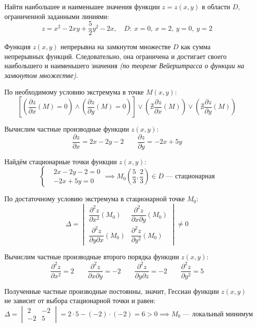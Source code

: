 \begin{problem}
Найти наибольшее и наименьшее значения функции \( z = z(x, y) \) в области \( D \), ограниченной заданными линиями:
\[ z = x^{2} - 2xy + \frac{5}{2}y^2 - 2x, \quad D:\ x=0,\ x=2,\ y=0,\ y=2 \]
\end{problem}

\begin{solution}
  Функция \( z(x,y) \) непрерывна на замкнутом множестве \( D \) как сумма непрерывных функций. Следовательно, она ограничена и достигает своего наибольшего и наименьшего значения \textit{(по теореме Вейерштрасса о функции на замкнутом множестве)}.

  По необходимому условию экстремума в точке \( M(x,y) \):
  \[ \left[\left(\dfrac{\partial z}{\partial x}(M)=0\right)\land\left(\dfrac{\partial z}{\partial y}(M)=0\right)\right]\lor\left(\nexists\dfrac{\partial z}{\partial x}(M)\right)\lor\left(\nexists\dfrac{\partial z}{\partial y}(M)\right) \]
  
  Вычислим частные производные функции \( z(x,y) \):
  \[ \dfrac{\partial z}{\partial x}=2x-2y-2\qquad\dfrac{\partial z}{\partial y}=-2x+5y \]
  
  Найдём стационарные точки функции \( z(x,y) \):
  \[
  \begin{cases*}
    &2x-2y-2=0\\
    &-2x+5y=0
  \end{cases*}\implies
  M_0\left(\frac{5}{3},\frac{2}{3}\right)\in D\text{ --- стационарная}
  \]
  
  По достаточному условию экстремума в стационарной точке \( M_0 \):
  \[ \Delta=
  \begin{vmatrix}
    \dfrac{\partial^2 z}{\partial x^2}(M_0) & \dfrac{\partial^2 z}{\partial x\partial y}(M_0) \\[2ex]
    \dfrac{\partial^2 z}{\partial y\partial x}(M_0) & \dfrac{\partial^2 z}{\partial y^2}(M_0)
  \end{vmatrix}\neq 0
  \]
  
  Вычислим частные производные второго порядка функции \( z(x,y) \):
  \[ \dfrac{\partial^2 z}{\partial x^2}=2\qquad\dfrac{\partial^2 z}{\partial x\partial y}=-2\qquad\dfrac{\partial^2 z}{\partial y\partial z}=-2\qquad\dfrac{\partial^2 z}{\partial y^2}=5 \]
  
  Полученные частные производные постоянны, значит, Гессиан функции \( z(x,y) \) не зависит от выбора стационарной точки и равен:
  \[ \Delta=
  \begin{vmatrix}
    2 & -2\\
    -2 & 5
  \end{vmatrix}=2\cdot 5-(-2)\cdot(-2)=6>0\implies M_0\text{ --- локальный минимум}
  \]
  

\end{solution}
